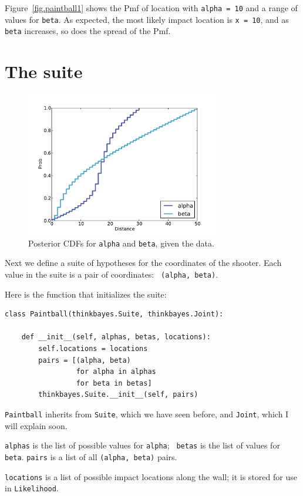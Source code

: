 \documentclass[12pt]{book}
\begin{document}
Figure~\ref{fig.paintball1} shows the Pmf of location with
{\tt alpha = 10} and a range of values for {\tt beta}.  As
expected, the most likely impact location is {\tt x = 10},
and as {\tt beta} increases, so does the spread of the Pmf.


\section{The suite}

\begin{figure}
\centerline{\includegraphics[height=2.5in]{figs/paintball2.pdf}}
\caption{Posterior CDFs for {\tt alpha} and {\tt beta}, given the data.}
\label{fig.paintball2}
\end{figure}

Next we define a suite of hypotheses for the coordinates of the
shooter.  Each value in the suite is a pair of coordinates: {\tt
  (alpha, beta)}.

Here is the function that initializes the suite:

\begin{verbatim}
class Paintball(thinkbayes.Suite, thinkbayes.Joint):

    def __init__(self, alphas, betas, locations):
        self.locations = locations
        pairs = [(alpha, beta) 
                 for alpha in alphas 
                 for beta in betas]
        thinkbayes.Suite.__init__(self, pairs)
\end{verbatim}

{\tt Paintball} inherits from {\tt Suite}, which we have seen before,
and {\tt Joint}, which I will explain soon.

{\tt alphas} is the list of possible values for {\tt alpha}; {\tt
  betas} is the list of values for {\tt beta}.  {\tt pairs} is a list
of all {\tt (alpha, beta)} pairs.

{\tt locations} is a list of possible impact locations along
the wall; it is stored for use in {\tt Likelihood}.
\end{document}
